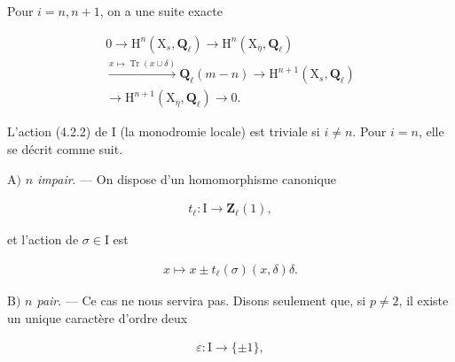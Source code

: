 \documentclass[10pt,leqno]{article}
\begin{document}
\noindent Pour \(i=n,n+1\), on a une suite exacte\par

\begin{equation*}\begin{gathered}0 \longrightarrow  \mathrm{H}^{n}(\mathrm{X}_{s},\mathbf{Q}_{\ell }) \longrightarrow  \mathrm{H}^{n}(\mathrm{X}_{\overline{\eta }},\mathbf{Q}_{\ell }) \\ \xrightarrow{x\longmapsto \operatorname{Tr}(x\cup \delta )} \mathbf{Q}_{\ell }(m- n) \longrightarrow  \mathrm{H}^{n+1}(\mathrm{X}_{s},\mathbf{Q}_{\ell }) \\ \longrightarrow  \mathrm{H}^{n+1}(\mathrm{X}_{\overline{\eta }},\mathbf{Q}_{\ell }) \longrightarrow  0.\end{gathered}\tag{4.3.3}\end{equation*}

\noindent L’action (4.2.2) de \(\mathrm{I}\) (la monodromie locale) est triviale si \(i\ne n\). Pour \(i=n\), elle se décrit comme suit.\par

\noindent \(\mathrm{A})\) \emph{\(n\) impair}. — On dispose d’un homomorphisme canonique\par

\begin{equation*}\begin{gathered}t_{\ell } : \mathrm{I} \longrightarrow  \mathbf{Z}_{\ell }(1),\end{gathered}\end{equation*}

\noindent et l’action de \(\sigma \in \mathrm{I}\) est\par

\begin{equation*}\begin{gathered}x \longmapsto  x \pm  t_{\ell }(\sigma )(x,\delta )\delta .\end{gathered}\end{equation*}

\clearpage

\label{physical-18}

\noindent \(\mathrm{B})\) \emph{\(n\) pair}. — Ce cas ne nous servira pas. Disons seulement que, si \(p\ne 2\), il existe un unique caractère d’ordre deux\par

\begin{equation*}\begin{gathered}\varepsilon  : \mathrm{I} \longrightarrow  \{\pm 1\},\end{gathered}\end{equation*}
\end{document}
